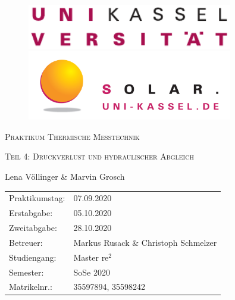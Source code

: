 \documentclass[10pt,a4paper,toc=listof,toc=bibliography]{scrartcl}
\begin{document}
\begin{titlepage}
	
	\begin{figure}[H]
		\begin{minipage}{0.5\textwidth}
			\centering
			\includegraphics[width=0.8\textwidth]{../DATA/Logo_Uni-Kassel.pdf}
		\end{minipage}\hfill
		\begin{minipage}{0.5\textwidth}
			\centering
			\includegraphics[width=0.8\textwidth]{../DATA/Logo_solar.png}
		\end{minipage}
	\end{figure}
	
		\vspace{3cm}
	
	\centering
	{\scshape\LARGE Praktikum Thermische Messtechnik \par}   %
	\vspace{1cm}
	{\scshape\Large Teil 4: Druckverlust und hydraulischer Abgleich \par}
	\vspace{1.5cm}
	\vspace{2cm}
	{\Large Lena Völlinger \& Marvin Grosch\par}
	\vfill
	
	\begin{large}
		\begin{tabular}{l l}
			
			Praktikumstag: & 07.09.2020 \\
			Erstabgabe: & 05.10.2020\\
			Zweitabgabe: & 28.10.2020\\
			Betreuer: & Markus Rusack \& Christoph Schmelzer\\
			Studiengang: & Master $\text{re}^2$\\
			Semester: & SoSe 2020\\
			Matrikelnr.: & 35597894, 35598242\\ 
		\end{tabular}
	\end{large}

\end{titlepage}
\end{document}
